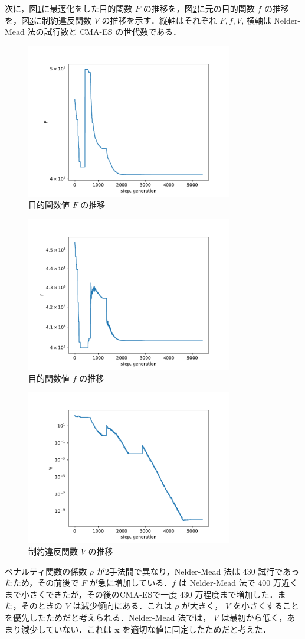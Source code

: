 \documentclass[twocolumn]{jarticle}
\begin{document}
次に，図\ref{img_F}に最適化をした目的関数 $F$ の推移を，図\ref{img_f}に元の目的関数 $f$ の推移を，図\ref{img_V}に制約違反関数 $V$ の推移を示す．縦軸はそれぞれ $F, f, V$, 横軸は Nelder-Mead 法の試行数と CMA-ES の世代数である．
\begin{figure}
    \centering
    \includegraphics[width=9cm]{img_F.pdf}
    \caption{目的関数値 $F$ の推移}
    \label{img_F}
\end{figure}
\begin{figure}
    \centering
    \includegraphics[width=9cm]{img_f.pdf}
    \caption{目的関数値 $f$ の推移}
    \label{img_f}
\end{figure}
\begin{figure}
    \centering
    \includegraphics[width=9cm]{img_V.pdf}
    \caption{制約違反関数 $V$ の推移} 
    \label{img_V}
\end{figure}
ペナルティ関数の係数 $\rho$ が2手法間で異なり，Nelder-Mead 法は 430 試行であったため，その前後で $F$ が急に増加している．$f$ は Nelder-Mead 法で 400 万近くまで小さくできたが，その後のCMA-ESで一度 430 万程度まで増加した．また，そのときの $V$ は減少傾向にある．これは  $\rho$ が大きく， $V$ を小さくすることを優先したためだと考えられる．Nelder-Mead 法では， $V$ は最初から低く，あまり減少していない．これは $\bm{x}$ を適切な値に固定したためだと考えた．
\end{document}
